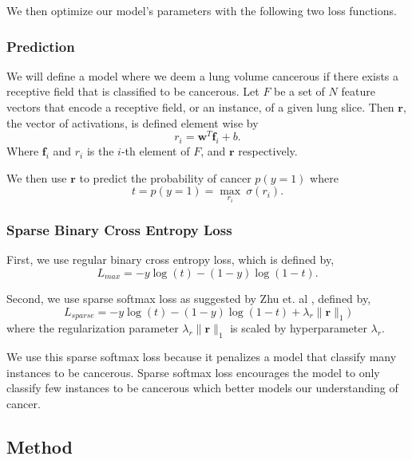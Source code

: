 \documentclass[twocolumn,10pt]{article}
\renewcommand{\b}{\boldsymbol}
\begin{document}
We then optimize our model's parameters with the following two loss functions.  


\subsubsection{Prediction}

We will define a model where we deem a lung volume cancerous if there exists
a receptive field that is classified to be cancerous. Let $F$ be a set of $N$ feature vectors that encode a
receptive field, or an instance, of a given
lung slice. 
Then $\b r$, the vector of activations, is defined element wise by
\begin{equation}
r_i = \b w^T \b f_i + b.
\end{equation}
Where $\b f_i$ and $r_i$ is the $i$-th element of $F$, and $\b r$ respectively.

We then use $\b r $ to predict the probability of cancer $p(y = 1)$ where
\begin{equation}
t = p(y = 1) = \max_{r_i} \ \sigma(r_i).
\end{equation}

\subsubsection{Sparse Binary Cross Entropy Loss}
First, we use regular binary cross entropy loss, which is defined by,
\begin{equation}
L_{max} = -y\log(t) - (1-y)\log(1-t).
\end{equation}

Second, we use sparse softmax loss as suggested by Zhu et. al \cite{DBLP:journals/corr/ZhuLVX16},
defined by,
\begin{equation}L_{sparse} = -y\log(t) - (1-y)\log(1-t)+ \lambda_r\|\b r\|_1)
\end{equation}
where the regularization parameter $\lambda_r\|\b r\|_1$ is scaled by
hyperparameter $\lambda_r$.

We use this sparse softmax loss because it penalizes a model that classify many instances 
to be cancerous. Sparse softmax loss encourages the model to only classify
few instances to be cancerous which better models our understanding of 
cancer.

\subsection{Method}
\end{document}
